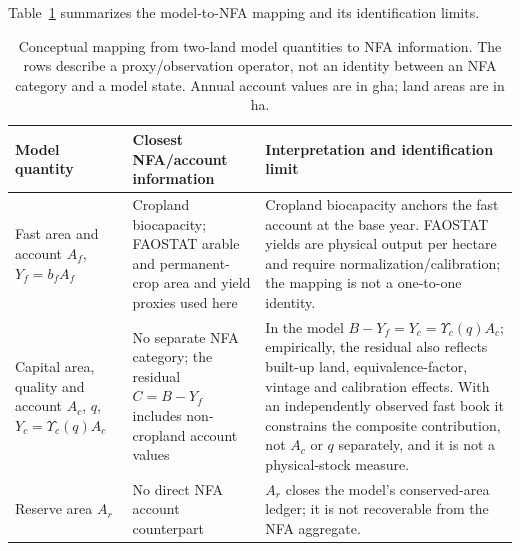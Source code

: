 \documentclass[11pt,a4paper]{article}
\newcommand{\Ups}{\Upsilon_c}
\begin{document}
Table~\ref{tab:si_model_nfa} summarizes the model-to-NFA mapping and its identification limits.

\begin{table}[htbp]
\centering\small
\caption{Conceptual mapping from two-land model quantities to NFA information. The rows describe a proxy/observation operator, not an identity between an NFA category and a model state. Annual account values are in gha; land areas are in ha.}
\label{tab:si_model_nfa}
\begin{tabularx}{\textwidth}{>{\raggedright\arraybackslash}p{} >{\raggedright\arraybackslash}p{} X}
\toprule
Model quantity & Closest NFA/account information & Interpretation and identification limit \\
\midrule
Fast area and account $A_f$, $Y_f=b_fA_f$ & Cropland biocapacity; FAOSTAT arable and permanent-crop area and yield proxies used here & Cropland biocapacity anchors the fast account at the base year. FAOSTAT yields are physical output per hectare and require normalization/calibration; the mapping is not a one-to-one identity. \\
Capital area, quality and account $A_c$, $q$, $Y_c=\Ups(q)A_c$ & No separate NFA category; the residual $C=B-Y_f$ includes non-cropland account values & In the model $B-Y_f=Y_c=\Ups(q)A_c$; empirically, the residual also reflects built-up land, equivalence-factor, vintage and calibration effects. With an independently observed fast book it constrains the composite contribution, not $A_c$ or $q$ separately, and it is not a physical-stock measure. \\
Reserve area $A_r$ & No direct NFA account counterpart & $A_r$ closes the model's conserved-area ledger; it is not recoverable from the NFA aggregate. \\
\bottomrule
\end{tabularx}
\end{table}
\end{document}

